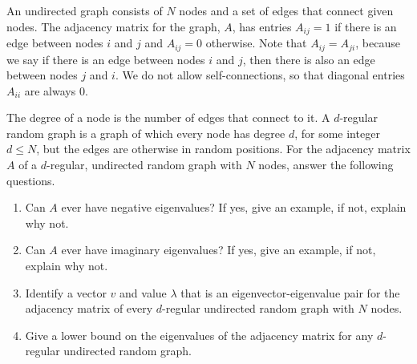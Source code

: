 \documentclass[10pt]{article}
\begin{document}
\begin{problem}
    An undirected graph consists of \( N \) nodes and a set of edges that connect given nodes. The adjacency matrix for the graph, \( A \), has entries \( A_{ij} = 1 \) if there is an edge between nodes \( i \) and \( j \) and \( A_{ij} = 0 \) otherwise. Note that \( A_{ij} = A_{ji} \), because
we say if there is an edge between nodes \( i \) and \( j \), then there is also an edge between nodes \( j \) and \( i \). We do not allow self-connections, so that diagonal entries \( A_{ii} \) are always 0.

    The degree of a node is the number of edges that connect to it. A \( d \)-regular random graph is a graph of which every node has degree \( d \), for some integer \( d \leq N \), but the edges are otherwise in random positions. For the adjacency matrix \( A \) of a \( d \)-regular, undirected random graph with \( N \) nodes, answer the following questions.
    \begin{enumerate}[nolistsep,label=(\alph*)]
        \item Can \( A \) ever have negative eigenvalues? If yes, give an example, if not, explain why not.
        \item Can \( A \) ever have imaginary eigenvalues? If yes, give an example, if not, explain why not.
        \item Identify a vector \( v \) and value \( \lambda \) that is an eigenvector-eigenvalue pair for the adjacency matrix of every \( d \)-regular undirected random graph with \( N \) nodes.
        \item Give a lower bound on the eigenvalues of the adjacency matrix for any \( d \)-regular undirected random graph.
    \end{enumerate}
\end{problem}
\end{document}
